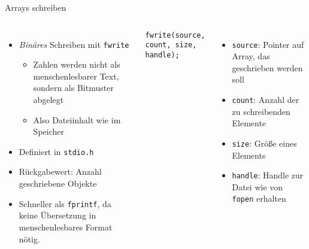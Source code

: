 \begin{frame}[fragile]{Arrays schreiben}
%
\begin{columns}[T]
\begin{itemize}
\item \emph{Binäres} Schreiben mit \texttt{fwrite}
\begin{itemize}
	\item Zahlen werden nicht als menschenlesbarer Text, sondern als Bitmuster abgelegt
	\item Also Dateiinhalt wie im Speicher
\end{itemize}
\item Definiert in \texttt{stdio.h}
\item Rückgabewert: Anzahl geschriebene Objekte
\item Schneller als \texttt{fprintf}, da keine Übersetzung in menschenlesbares Format nötig.
\end{itemize}
%
\vspace{-10pt}
\begin{codebox}[Syntax]
\begin{verbatim}
fwrite(source, count, size, handle);
\end{verbatim}
\end{codebox}
%
\begin{itemize}
\item \texttt{source}: Pointer auf Array, das geschrieben werden soll
\item \texttt{count}: Anzahl der zu schreibenden Elemente
\item \texttt{size}: Größe eines Elements
\item \texttt{handle}: Handle zur Datei wie von \texttt{fopen} erhalten
\end{itemize}
\end{columns}
%
\end{frame}


